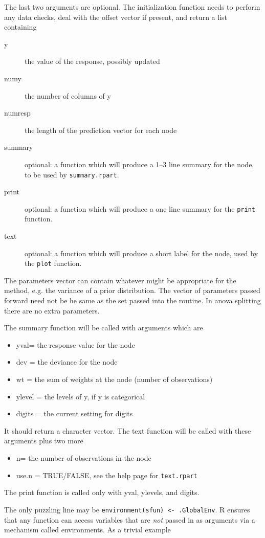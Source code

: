 The last two arguments are optional.
The initialization function needs to perform any data checks,
deal with the offset
vector if present, and return a list containing
\begin{description}
  \item[y] the value of the response, possibly updated
  \item[numy] the number of columns of y
  \item[numresp] the length of the prediction vector for each node
  \item[summary] optional: a function which will produce a 1--3 line summary for the
    node, to be used by \texttt{summary.rpart}.
  \item[print] optional: a function which will produce a one line summary for
    the \texttt{print} function.
  \item[text] optional: a function which will produce a short label for the node,
    used by the \texttt{plot} function.
  \end{description}

The parameters vector can contain whatever might be appropriate for
the method, e.g. the variance of a prior distribution.
The vector of parameters passed forward need not be he same as the set
passed into the routine.
In anova splitting there are no extra parameters.

  The summary function will be called with arguments which are
  \begin{itemize}
    \item yval= the response value for the node
    \item dev = the deviance for the node
    \item wt = the sum of weights at the node (number of observations)
    \item ylevel = the levels of y, if y is categorical
    \item digits = the current setting for digits
  \end{itemize}
It should return a character vector.
The text function will be called with these arguments plus two more
\begin{itemize}
  \item n= the number of observations in the node
  \item use.n = TRUE/FALSE, see the help page for \texttt{text.rpart}
\end{itemize}
The print function is called only with yval, ylevels, and digits.

The only puzzling line may be \texttt{environment(sfun) <- .GlobalEnv}.
R ensures that any function can access variables that are \emph{not}
passed in as arguments via a mechanism called environments.
As a trivial example

